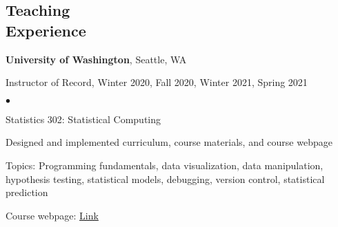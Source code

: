 \documentclass[margin,centered]{res}
\newenvironment{list1}{
  \begin{list}{\ding{113}}{%
      \setlength{\itemsep}{0in}
      \setlength{\parsep}{0in} \setlength{\parskip}{0in}
      \setlength{\topsep}{0in} \setlength{\partopsep}{0in}
      \setlength{\leftmargin}{0.17in}}}{\end{list}}
\newenvironment{list2}{
  \begin{list}{$\bullet$}{%
      \setlength{\itemsep}{0in}
      \setlength{\parsep}{0in} \setlength{\parskip}{0in}
      \setlength{\topsep}{0in} \setlength{\partopsep}{0in}
      \setlength{\leftmargin}{0.2in}}}{\end{list}}
\begin{document}
\begin{resume}
\begin{comment}
{\bf MN2020}, St. Paul, Minnesota
\begin{list1}
\item[] 
Education Research Fellow, January 2013--February 2013
\begin{list2}
\vspace*{.05in}
\item Analyzed local, state, and national education policy through the lens of racial and socioeconomic equity
\item Composed reports evaluating current policy and advocating for policy change
\item Published policy reports to various social media outlets with over 47,000 subscribers
\item Gathered and cleaned data for project to evaluate charter school funding and outcomes
\end{list2}
\end{list1}
\end{comment}

\section{\sc Teaching \\ Experience}

{\bf University of Washington}, Seattle, WA
\begin{list1}
\item[] Instructor of Record, Winter 2020, Fall 2020, Winter 2021, Spring 2021
\begin{list2}
\vspace*{.05in}
\item Statistics 302: Statistical Computing
\item Designed and implemented curriculum, course materials, and course webpage
\item Topics: Programming fundamentals, data visualization, data manipulation, hypothesis testing, statistical models, debugging, version control, statistical prediction
\item Course webpage: \href{https://bryandmartin.github.io/STAT302}{Link}
\end{list2}
\end{list1}


\end{resume}
\end{document}
